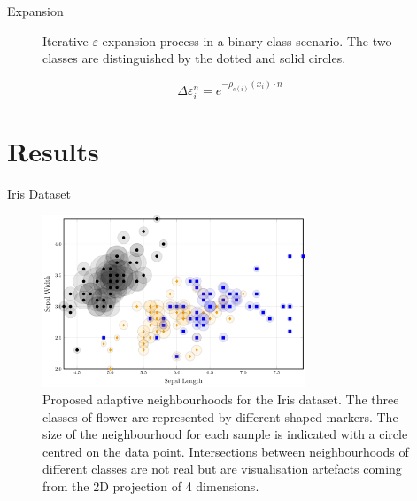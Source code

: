 \documentclass[smaller]{beamer}
\begin{document}
\begin{frame}[label={sec:org1165a77}]{Expansion}
\begin{figure}
    \centering
\caption{Iterative $\varepsilon$-expansion process in a binary class scenario. The two classes are distinguished by the dotted and solid circles.}
\label{fig:e_expansion}
\end{figure}

\begin{equation}
    \Delta\varepsilon_i^n=e^{-\rho_{c(i)}(x_i) \cdot n}
    \label{eq:step}
\end{equation}
\end{frame}

\section{Results}
\label{sec:org4782893}


\begin{frame}[label={sec:org43ff08e}]{Iris Dataset}
\begin{figure}
    \centering
    \includegraphics[width=0.7\textwidth]{images/iris-eps.png}
    \caption{Proposed adaptive neighbourhoods for the Iris dataset. The three classes of flower are represented by different shaped markers. The size of the neighbourhood for each sample is indicated with a circle centred on the data point. Intersections between neighbourhoods of different classes are not real but are visualisation artefacts coming from the 2D projection of 4 dimensions.}
    \label{fig:iris}
\end{figure}
\end{frame}
\end{document}
